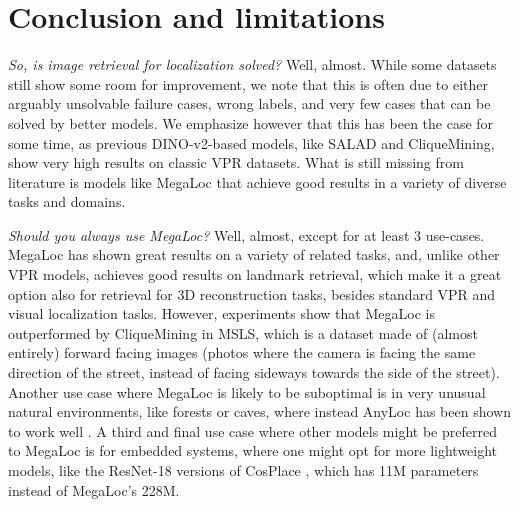 
\section{Conclusion and limitations}
\textit{So, is image retrieval for localization solved?}
Well, almost. While some datasets still show some room for improvement, we note that this is often due to either arguably unsolvable failure cases, wrong labels, and very few cases that can be solved by better models.
We emphasize however that this has been the case for some time, as previous DINO-v2-based models, like SALAD and CliqueMining, show very high results on classic VPR datasets.
What is still missing from literature is models like MegaLoc that achieve good results in a variety of diverse tasks and domains.

\textit{Should you always use MegaLoc?}
Well, almost, except for at least 3 use-cases.
MegaLoc has shown great results on a variety of related tasks, and, unlike other VPR models, achieves good results on landmark retrieval, which make it a great option also for retrieval for 3D reconstruction tasks, besides standard VPR and visual localization tasks.
However, experiments show that MegaLoc is outperformed by CliqueMining in MSLS, which is a dataset made of (almost entirely) forward facing images (\ie photos where the camera is facing the same direction of the street, instead of facing sideways towards the side of the street).
Another use case where MegaLoc is likely to be suboptimal is in very unusual natural environments, like forests or caves, where instead AnyLoc has been shown to work well \cite{Keetha_2023_AnyLoc}.
A third and final use case where other models might be preferred to MegaLoc is for embedded systems, where one might opt for more lightweight models, like the ResNet-18 \cite{He_2016_resnet} versions of CosPlace \cite{Berton_2022_cosPlace}, which has 11M parameters instead of MegaLoc's 228M.
